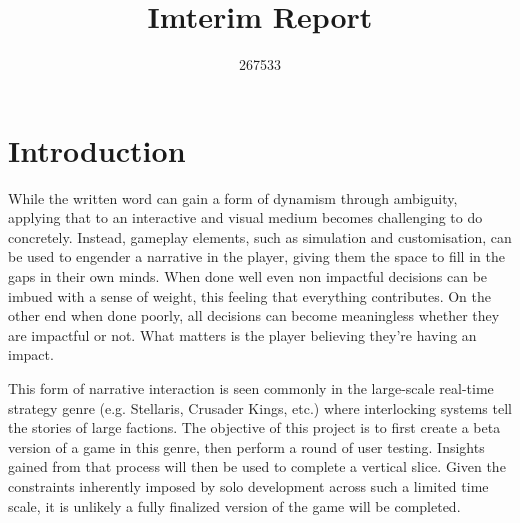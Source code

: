 \documentclass{report}
\begin{document}
\title{Imterim Report}
\author{267533}

\maketitle

\section{Introduction}
While the written word can gain a form of dynamism through ambiguity, applying that to an interactive and visual medium becomes challenging to do concretely. Instead, gameplay elements, such as simulation and customisation, can be used to engender a narrative in the player, giving them the space to fill in the gaps in their own minds. When done well even non impactful decisions can be imbued with a sense of weight, this feeling that everything contributes. On the other end when done poorly, all decisions can become meaningless whether they are impactful or not. What matters is the player believing they're having an impact. 

This form of narrative interaction is seen commonly in the large-scale real-time strategy genre (e.g. Stellaris, Crusader Kings, etc.) where interlocking systems tell the stories of large factions. The objective of this project is to first create a beta version of a game in this genre, then perform a round of user testing. Insights gained from that process will then be used to complete a vertical slice. Given the constraints inherently imposed by solo development across such a limited time scale, it is unlikely a fully finalized version of the game will be completed.
\end{document}
